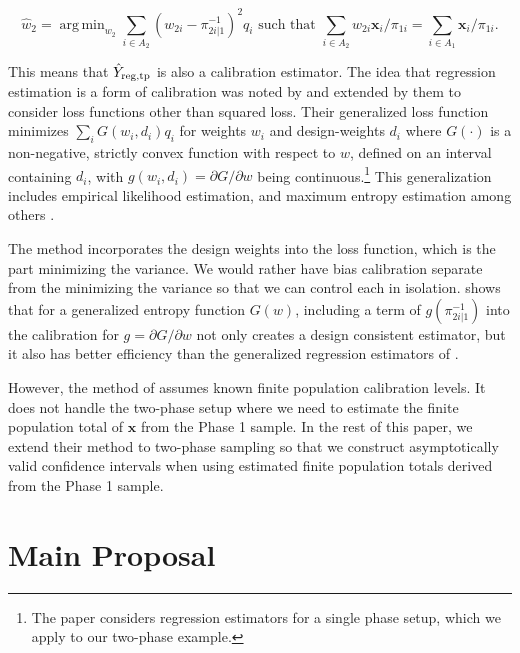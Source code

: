 \documentclass[12pt]{article}
\DeclareMathOperator*{\argmin}{arg\,min}
\renewcommand{\bf}[1]{\mathbf{#1}}
\begin{document}
$$
\hat w_{2} = \argmin_{w_2} \sum_{i \in A_2} (w_{2i} - \pi_{2i|1}^{-1})^2 q_i
\text{ such that } \sum_{i \in A_2} w_{2i} \bf x_i / \pi_{1i} = \sum_{i \in A_1}
\bf x_i / \pi_{1i}.
$$

This means that $\hat Y_{\rm reg, tp}$ is also a calibration estimator. The idea
that regression estimation is a form of calibration was noted by
\cite{deville1992calibration} and extended by them to consider loss functions
other than squared loss. Their generalized loss function minimizes
$\sum_i G(w_i, d_i)q_i$ for weights $w_i$ and design-weights $d_i$ where
$G(\cdot)$ is a non-negative, strictly convex function with respect to $w$,
defined on an interval containing $d_i$, with $g(w_i, d_i) = \partial G /
\partial w$ being continuous.\footnote{The \cite{deville1992calibration} paper
considers regression estimators for a single phase setup, which we apply to our
two-phase example.} This
generalization includes empirical likelihood estimation, and maximum entropy
estimation among others \citep{schennach2007point}. 

The \cite{deville1992calibration} method incorporates the design weights into
the loss function, which is the part minimizing the variance. We would rather
have bias calibration separate from the minimizing the variance so that
we can control each in isolation. 
\cite{kwon2024debiased} shows that for a generalized entropy
function $G(w)$, including a term of $g(\pi_{2i|1}^{-1})$ into the calibration
for $g = \partial G / \partial w$ not only creates a design consistent
estimator, but it also has better efficiency than the generalized regression
estimators of \cite{deville1992calibration}.

However, the method of \cite{kwon2024debiased} assumes known finite population 
calibration levels. It does not handle the
two-phase setup where we need to estimate the finite population total of $\bf x$
from the Phase 1 sample. In the rest of this paper, we extend their method to 
two-phase sampling so that we construct asymptotically valid confidence
intervals when using estimated finite population totals derived from the Phase 1
sample.

\section{Main Proposal}
\end{document}
